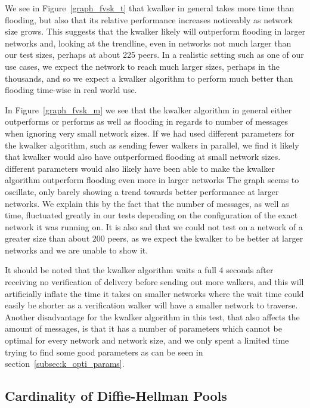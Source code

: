 We see in Figure~\ref{graph_fvsk_t} that kwalker in general takes more time than flooding, but also that its relative performance increases noticeably as network size grows. This suggests that the kwalker likely will outperform flooding in larger networks and, looking at the trendline, even in networks not much larger than our test sizes, perhaps at about 225 peers. In a realistic setting such as one of our use cases, we expect the network to reach much larger sizes, perhaps in the thousands, and so we expect a kwalker algorithm to perform much better than flooding time-wise in real world use.

In Figure~\ref{graph_fvsk_m} we see that the kwalker algorithm in general either outperforms or performs as well as flooding in regards to number of messages when ignoring very small network sizes.
If we had used different parameters for the kwalker algorithm, such as sending fewer walkers in parallel, we find it likely that kwalker would also have outperformed flooding at small network sizes. different parameters would also likely have been able to make the kwalker algorithm outperform flooding even more in larger networks
The graph seems to oscillate, only barely showing a trend towards better performance at larger networks. We explain this by the fact that the number of messages, as well as time, fluctuated greatly in our tests depending on the configuration of the exact network it was running on. It is also sad that we could not test on a network of a greater size than about 200 peers, as we expect the kwalker to be better at larger networks and we are unable to show it.

It should be noted that the kwalker algorithm waits a full 4 seconds after receiving no verification of delivery before sending out more walkers, and this will artificially inflate the time it takes on smaller networks where the wait time could easily be shorter as a verification walker will have a smaller network to traverse. Another disadvantage for the kwalker algorithm in this test, that also affects the amount of messages, is that it has a number of parameters which cannot be optimal for every network and network size, and we only spent a limited time trying to find some good parameters as can be seen in section~\ref{subsec:k_opti_params}.

\subsection{Cardinality of Diffie-Hellman Pools}

